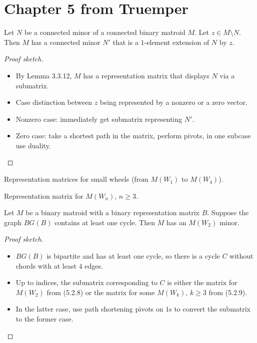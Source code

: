 \section{Chapter 5 from Truemper}

\begin{lemma}[5.2.4]
  \label{lem:5.2.4}
  Let $N$ be a connected minor of a connected binary matroid $M$. Let $z \in M \setminus N$. Then $M$ has a connected minor $N'$ that is a $1$-element extension of $N$ by $z$.
\end{lemma}

\begin{proof}[Proof sketch]
  \begin{itemize}
    \item By Lemma 3.3.12, $M$ has a representation matrix that displays $N$ via a submatrix.
    \item Case distinction between $z$ being represented by a nonzero or a zero vector.
    \item Nonzero case: immediately get submatrix representing $N'$.
    \item Zero case: take a shortest path in the matrix, perform pivots, in one subcase use duality.
  \end{itemize}
\end{proof}

\begin{proposition}[5.2.8]
  \label{prop:5.2.8}
  Representation matrices for small wheels (from $M(W_{1})$ to $M(W_{4})$).
\end{proposition}

\begin{proposition}[5.2.9]
  \label{prop:5.2.9}
  Representation matrix for $M(W_{n})$, $n \geq 3$.
\end{proposition}

\begin{lemma}[5.2.10]
  \label{lem:5.2.10}
  Let $M$ be a binary matroid with a binary representation matrix $B$. Suppose the graph $BG(B)$ contains at least one cycle. Then $M$ has an $M(W_{2})$ minor.
\end{lemma}

\begin{proof}[Proof sketch]
  \begin{itemize}
    \item $BG(B)$ is bipartite and has at least one cycle, so there is a cycle $C$ without chords with at least $4$ edges.
    \item Up to indices, the submatrix corresponding to $C$ is either the matrix for $M(W_{2})$ from (5.2.8) or the matrix for some $M(W_{k})$, $k \geq 3$ from (5.2.9).
    \item In the latter case, use path shortening pivots on $1$s to convert the submatrix to the former case.
  \end{itemize}
\end{proof}

